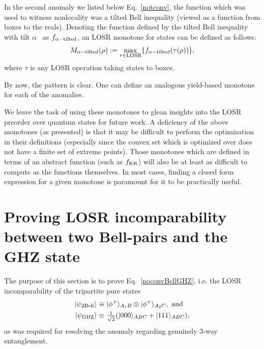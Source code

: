 \documentclass[12pt]{article}
\newcommand{\ket}[1]{\left| #1 \right>}
\newcommand{\LOSR}[0]{\ifmmode\textup{\upshape LOSR}\else{\textup{\upshape LOSR}}\fi}
\theoremstyle{plain}
\theoremstyle{definition}
\begin{document}
\begin{appendices}
In the second anomaly we listed below Eq.~\eqref{notconv}, the function which was used to witness nonlocality was a tilted Bell inequality (viewed as a function from boxes to the reals). Denoting the function defined by the tilted Bell inequality with tilt $\alpha$~\cite{Yang2013selftesting,Bamps2015selftesting} as $f_{\alpha-{\rm tilted}}$, an LOSR monotone for states can be defined as follows:
\begin{equation}
M_{\alpha-{\rm tilted}}(\rho) := \max_{\tau \in \LOSR} \{ f_{\alpha-{\rm tilted}}(\tau(\rho)) \},
\end{equation}
where $\tau$ is any LOSR operation taking states to boxes.

By now, the pattern is clear. One can define an analogous yield-based monotone for each of the anomalies.

We leave the task of using these monotones to glean insights into the LOSR preorder over quantum states for future work. A deficiency of the above monotones (as presented) is that it may be difficult to perform the optimization in their definitions (especially since the convex set which is optimized over does not have a finite set of extreme points). Those monotones which are defined in terms of an abstract function (such as $f_{\rm KR}$) will also be at least as difficult to compute as the functions themselves. In most cases, finding a closed form expression for a given monotone is paramount for it to be practically useful.

\section{Proving LOSR incomparability between two Bell-pairs and the GHZ state} \label{BellGHZ}

The purpose of this section is to prove Eq.~\eqref{noconvBellGHZ}, i.e. the LOSR incomparability of the tripartite pure states
\begin{align}
    \ket{\psi_{\rm 2Bell}} &\equiv |\phi^{+}\rangle_{A_1B}\otimes  |\phi^{+}\rangle_{A_2C}, \text{ and }\\
    |\psi_{\rm GHZ}\rangle &\equiv \tfrac{1}{\sqrt{2}} (|000\rangle_{ABC} +|111\rangle_{ABC}),
\end{align}
as was required for resolving the anomaly regarding genuinely $3$-way entanglement.


\end{appendices}
\end{document}
